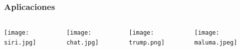 \begin{frame}
\begin{columns}
\begin{column}{0.5\textwidth}
		\end{column}
		
	\end{columns}

\end{frame}


\begin{frame}
	\frametitle{Aplicaciones}
	\begin{columns}
		\begin{column}{0.25\textwidth}
			\centering
			\texttt{[image: siri.jpg]}
		\end{column}
		\begin{column}{0.25\textwidth}
			\centering
			\texttt{[image: chat.jpg]}
		\end{column}
		\begin{column}{0.25\textwidth}
			\centering
			\texttt{[image: trump.png]}
		\end{column}
		\begin{column}{0.25\textwidth}
			\texttt{[image: maluma.jpeg]}
		\end{column}
	\end{columns}
\end{frame}






